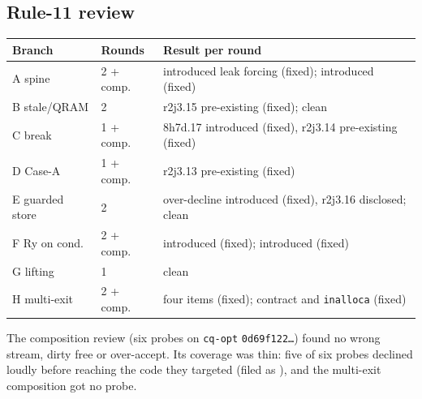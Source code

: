\subsection*{Rule-11 review}
\begin{tabular}{@{}lll@{}}\toprule
Branch & Rounds & Result per round \\ \midrule
A spine & 2 + comp. & introduced leak forcing (fixed); introduced (fixed) \\
B stale/QRAM & 2 & r2j3.15 pre-existing (fixed); clean \\
C break & 1 + comp. & 8h7d.17 introduced (fixed), r2j3.14 pre-existing (fixed) \\
D Case-A & 1 + comp. & r2j3.13 pre-existing (fixed) \\
E guarded store & 2 & over-decline introduced (fixed), r2j3.16 disclosed; clean \\
F Ry on cond. & 2 + comp. & introduced (fixed); introduced (fixed) \\
G lifting & 1 & clean \\
H multi-exit & 2 + comp. & four items (fixed); contract and \texttt{inalloca} (fixed) \\
\bottomrule\end{tabular}

The composition review (six probes on \texttt{cq-opt} \texttt{0d69f122\ldots}) found no
wrong stream, dirty free or over-accept. Its coverage was thin: five of six probes declined
loudly before reaching the code they targeted (filed as ), and the multi-exit
composition got no probe.

